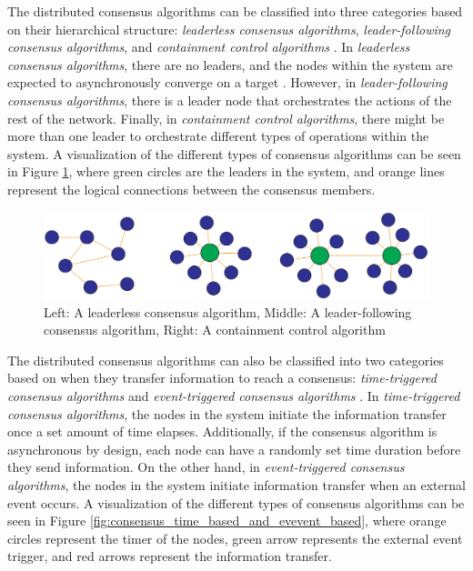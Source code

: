 The distributed consensus algorithms can be classified into three categories based on their hierarchical structure: \emph{leaderless consensus algorithms}, \emph{leader-following consensus algorithms}, and \emph{containment control algorithms} \cite{consensus_systems_survey}. In \emph{leaderless consensus algorithms}, there are no leaders, and the nodes within the system are expected to asynchronously converge on a target \cite{Ge_Han_2017}. However, in \emph{leader-following consensus algorithms}, there is a leader node that orchestrates the actions of the rest of the network. Finally, in \emph{containment control algorithms}, there might be more than one leader to orchestrate different types of operations within the system. A visualization of the different types of consensus algorithms can be seen in Figure \ref{fig:consensus_types_detailed}, where green circles are the leaders in the system, and orange lines represent the logical connections between the consensus members.


\begin{figure}[H]
    \centering
    \includegraphics[width=0.7\columnwidth]{final-proposal/images/consensus_types.png}
    \caption{Left: A leaderless consensus algorithm, Middle: A leader-following consensus algorithm, Right: A containment control algorithm}
    \label{fig:consensus_types_detailed}
\end{figure}


The distributed consensus algorithms can also be classified into two categories based on when they transfer information to reach a consensus: \emph{time-triggered consensus algorithms} and \emph{event-triggered consensus algorithms} \cite{consensus_systems_survey}. In \emph{time-triggered consensus algorithms}, the nodes in the system initiate the information transfer once a set amount of time elapses. Additionally, if the consensus algorithm is asynchronous by design, each node can have a randomly set time duration before they send information. On the other hand, in \emph{event-triggered consensus algorithms}, the nodes in the system initiate information transfer when an external event occurs. A visualization of the different types of consensus algorithms can be seen in Figure \ref{fig:consensus_time_based_and_evevent_based}, where orange circles represent the timer of the nodes, green arrow represents the external event trigger, and red arrows represent the information transfer.


